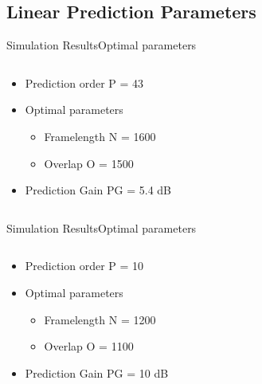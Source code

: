 \subsection{Linear Prediction Parameters}
\begin{frame}{Simulation Results}{Optimal parameters}		
\begin{columns}
	\begin{column}{0.4\textwidth}
		\begin{itemize}
			\item Prediction order P = 43
			\item Optimal parameters
			\begin{itemize}
				\item Framelength N = 1600
				\item Overlap O = 1500
			\end{itemize}
			\item Prediction Gain PG = 5.4 dB
		\end{itemize}
	\end{column}
	\begin{column}{0.6\textwidth} 
		\resizebox{0.9\columnwidth}{!}{		
			}
	\end{column}
\end{columns}
\end{frame}

\begin{frame}{Simulation Results}{Optimal parameters}		
\begin{columns}
	\begin{column}{0.4\textwidth}
	\begin{itemize}
		\item Prediction order P = 10
		\item Optimal parameters
		\begin{itemize}
			\item Framelength N = 1200
			\item Overlap O = 1100
		\end{itemize}
		\item Prediction Gain PG = 10 dB
	\end{itemize}
	\end{column}
	\begin{column}{0.6\textwidth} 
		\resizebox{0.9\columnwidth}{!}{		
			}
	\end{column}
\end{columns}
\end{frame}






